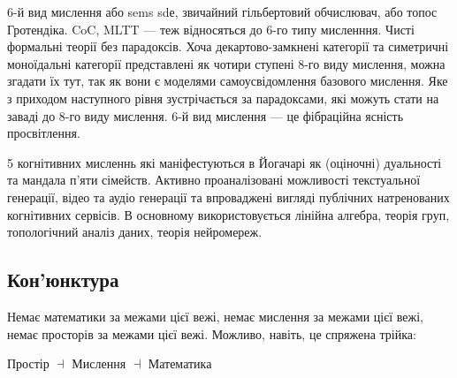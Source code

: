 6-й вид мислення або sems sdе, звичайний гільбертовий обчислювач, або топос Гротендіка.
CoC, MLTT --- теж відносяться до 6-го типу мисленння. Чисті формальні теорії без парадоксів.
Хоча декартово-замкнені категорії та симетричні моноїдальні категорії представлені як чотири
ступені 8-го виду мислення, можна згадати їх тут, так як вони є моделями самоусвідомлення
базового мислення. Яке з приходом наступного рівня зустрічається за парадоксами, які можуть
стати на заваді до 8-го виду мислення. 6-й вид мислення --- це фібраційна ясність просвітлення.

5 когнітивних мисленнь які маніфестуються в Йогачарі як (оціночні) дуальності та мандала
п'яти сімейств. Активно проаналізовані можливості текстуальної генерації, відео та аудіо
генерації та впроваджені вигляді публічних натренованих когнітивних сервісів. В основному
використовується лінійна алгебра, теорія груп, топологічний аналіз даних, теорія нейромереж.

\subsection*{Кон'юнктура}

Немає математики за межами цієї вежі, немає мислення за межами цієї вежі, немає просторів
за межами цієї вежі. Можливо, навіть, це спряжена трійка:
\begin{center}Простір $\dashv$ Мислення $\dashv$ Математика\end{center}
